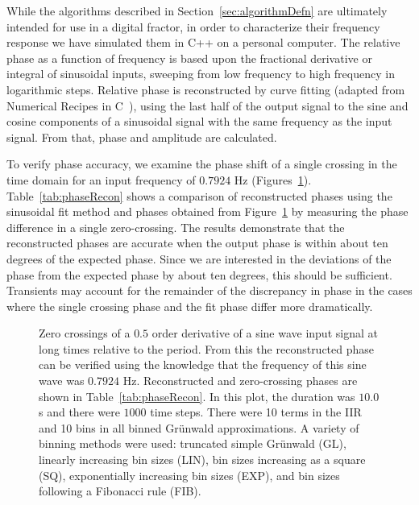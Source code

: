 While the algorithms described in Section~\ref{sec:algorithmDefn} are
ultimately intended for use in a digital fractor, in order to
characterize their frequency response we have simulated them in C++ on a
personal computer. The relative phase as a function of frequency is based upon the
fractional derivative or integral of sinusoidal inputs, sweeping from
low frequency to high frequency in logarithmic steps. Relative phase
is reconstructed by curve fitting (adapted from Numerical Recipes in C~\cite{Press:92}), using the last
half of the output signal to the sine and cosine components of a
sinusoidal signal with the same frequency as the input signal. From that, phase and amplitude are calculated.

To verify phase accuracy, we examine the phase shift of a single
crossing in the time domain for an input frequency of $0.7924$ Hz
(Figures~\ref{fig:timeDomain}). Table~\ref{tab:phaseRecon}
shows a comparison of reconstructed phases using the sinusoidal fit
method and phases obtained from Figure~\ref{fig:timeDomain} by
measuring the phase difference in a single zero-crossing. The results demonstrate that the reconstructed phases are accurate when the output phase is within about ten degrees of the expected phase. Since we are interested in the deviations of the phase from the expected phase by about ten degrees, this should be sufficient. Transients may account for the remainder of the discrepancy in phase in the cases where the single crossing phase and the fit phase differ more dramatically. 


\begin{figure}
\begin{center}
\end{center}
\caption{Zero crossings of a $0.5$ order derivative of a sine wave input signal
at long times relative to the period. From this the reconstructed
  phase can be verified using the knowledge that the frequency of this
  sine wave was $0.7924$ Hz. Reconstructed and zero-crossing phases
  are shown in Table~\ref{tab:phaseRecon}. In this plot, the duration
  was $10.0$ s and there were $1000$ time steps. There were 10 terms
  in the IIR and 10 bins in all binned Gr{\"u}nwald approximations. A
  variety of binning methods were used: truncated simple Gr{\"u}nwald
  (GL), linearly increasing bin sizes (LIN), bin sizes increasing as a
  square (SQ), exponentially increasing bin sizes (EXP), and bin sizes
  following a Fibonacci rule (FIB).}
\label{fig:timeDomain}
\end{figure}

